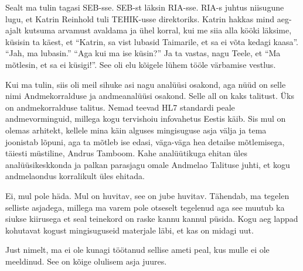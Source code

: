 Sealt ma tulin tagasi SEB-sse. SEB-st läksin RIA-sse. RIA-s juhtus niisugune lugu, et Katrin 
Reinhold tuli TEHIK-usse direktoriks. Katrin hakkas mind aeg-ajalt kutsuma arvamust avaldama 
ja ühel korral, kui me siia alla kööki läksime, küsisin ta käest, et 
\enquote{Katrin, sa vist lubasid Taimarile, et sa ei võta kedagi kaasa}. \enquote{Jah, ma lubasin.} 
\enquote{Aga kui ma ise küsin?} Ja ta vastas, nagu Teele, et \enquote{Ma 
mõtlesin, et sa ei küsigi!}. See oli elu kõigele lühem tööle värbamise vestlus. 

Kui ma tulin, siis oli meil sihuke asi nagu analüüsi osakond, aga nüüd on selle 
nimi Andmekorralduse ja andmeanalüüsi osakond. Selle all on kaks talitust. Üks 
on andmekorralduse talitus. Nemad teevad HL7 standardi peale andmevorminguid, millega kogu 
tervishoiu infovahetus Eestis käib. Sis mul on olemas arhitekt, kellele mina 
käin alguses mingisuguse asja välja ja tema joonistab lõpuni, aga ta mõtleb ise 
edasi, väga-väga hea detailse mõtlemisega, täiesti müstiline, Andrus 
Tamboom. Kahe analüütikuga ehitan üles  
analüüsikeskkonda ja palkan parasjagu omale Andmelao Talituse juhti, et kogu 
andmelaondus korralikult üles ehitada. 


Ei, mul pole häda. Mul on huvitav, see on jube huvitav. Tähendab, ma tegelen 
selliste asjadega, millega ma varem pole otseselt tegelenud aga see muutub ka 
siukse kiirusega et seal teinekord on raske kannu kannul püsida. Kogu aeg 
lappad kohutavat kogust mingisuguseid materjale läbi, et kas on midagi uut. 


Just nimelt, ma ei ole kunagi töötanud sellise ameti peal, kus mulle ei ole 
meeldinud. See on kõige olulisem asja juures. 